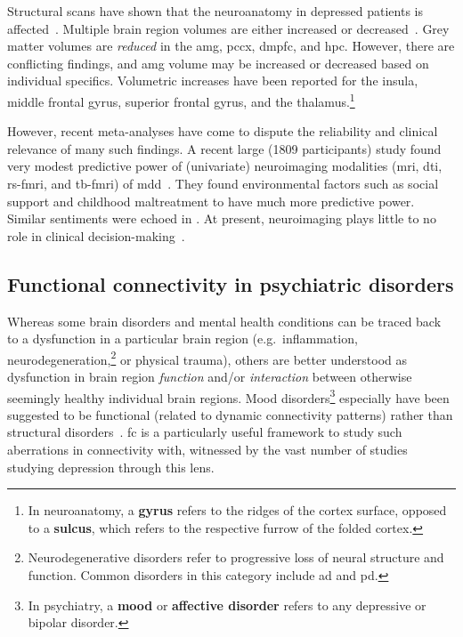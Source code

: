 Structural scans have shown that the neuroanatomy in depressed patients is affected~\parencite{Drevets2000}.
Multiple brain region volumes are either increased or decreased~\parencite{Sacher2012, Schmaal2020}.
Grey matter volumes are \emph{reduced} in the \gls{amg}, \gls{pccx}, \gls{dmpfc}, and \gls{hpc}.
However, there are conflicting findings, and \gls{amg} volume may be increased or decreased based on individual specifics.
Volumetric increases have been reported for the insula, middle frontal gyrus, superior frontal gyrus, and the thalamus.\footnote{In neuroanatomy, a \textbf{gyrus} refers to the ridges of the cortex surface, opposed to a \textbf{sulcus}, which refers to the respective furrow of the folded cortex.}

However, recent meta-analyses have come to dispute the reliability and clinical relevance of many such findings.
A recent large (1809 participants) study found very modest predictive power of (univariate) neuroimaging modalities (\gls{mri}, \gls{dti}, \gls{rs-fmri}, and \gls{tb-fmri}) of \gls{mdd}~\parencite{Winter2022}.
They found environmental factors such as social support and childhood maltreatment to have much more predictive power.
Similar sentiments were echoed in \textcite{Nour2022}.
At present, neuroimaging plays little to no role in clinical decision-making~\parencite{Kapur2012}.

\subsection{Functional connectivity in psychiatric disorders}\label{subsec:fc-depression}

Whereas some brain disorders and mental health conditions can be traced back to a dysfunction in a particular brain region (e.g.~inflammation, neurodegeneration,\footnote{Neurodegenerative disorders refer to progressive loss of neural structure and function. Common disorders in this category include \gls{ad} and \gls{pd}.} or physical trauma), others are better understood as dysfunction in brain region \emph{function} and/or \emph{interaction} between otherwise seemingly healthy individual brain regions.
Mood disorders\footnote{In psychiatry, a \textbf{mood} or \textbf{affective disorder} refers to any depressive or bipolar disorder.} especially have been suggested to be functional (related to dynamic connectivity patterns) rather than structural disorders~\parencite{Piguet2021}.
\Gls{fc} is a particularly useful framework to study such aberrations in connectivity with, witnessed by the vast number of studies studying depression through this lens.


